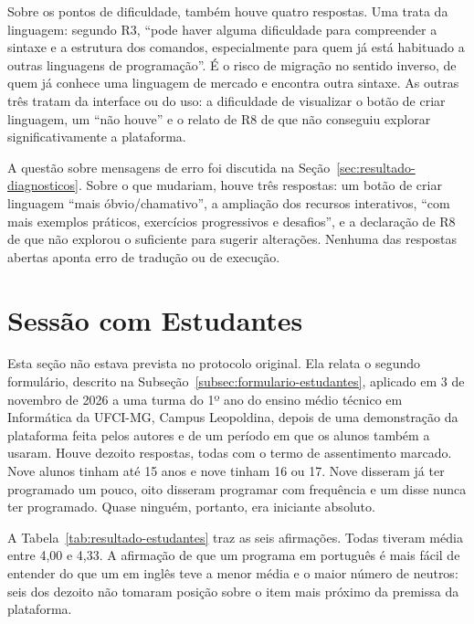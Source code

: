 Sobre os pontos de dificuldade, também houve quatro respostas. Uma trata da linguagem: segundo R3, ``pode haver alguma dificuldade para compreender a sintaxe e a estrutura dos comandos, especialmente para quem já está habituado a outras linguagens de programação''. É o risco de migração no sentido inverso, de quem já conhece uma linguagem de mercado e encontra outra sintaxe. As outras três tratam da interface ou do uso: a dificuldade de visualizar o botão de criar linguagem, um ``não houve'' e o relato de R8 de que não conseguiu explorar significativamente a plataforma.

A questão sobre mensagens de erro foi discutida na Seção~\ref{sec:resultado-diagnosticos}. Sobre o que mudariam, houve três respostas: um botão de criar linguagem ``mais óbvio/chamativo'', a ampliação dos recursos interativos, ``com mais exemplos práticos, exercícios progressivos e desafios'', e a declaração de R8 de que não explorou o suficiente para sugerir alterações. Nenhuma das respostas abertas aponta erro de tradução ou de execução.

\section{Sessão com Estudantes}
\label{sec:resultado-estudantes}

Esta seção não estava prevista no protocolo original. Ela relata o segundo formulário, descrito na Subseção~\ref{subsec:formulario-estudantes}, aplicado em 3 de novembro de 2026 a uma turma do 1º ano do ensino médio técnico em Informática da UFCI-MG, Campus Leopoldina, depois de uma demonstração da plataforma feita pelos autores e de um período em que os alunos também a usaram. Houve dezoito respostas, todas com o termo de assentimento marcado. Nove alunos tinham até 15 anos e nove tinham 16 ou 17. Nove disseram já ter programado um pouco, oito disseram programar com frequência e um disse nunca ter programado. Quase ninguém, portanto, era iniciante absoluto.

A Tabela~\ref{tab:resultado-estudantes} traz as seis afirmações. Todas tiveram média entre 4,00 e 4,33. A afirmação de que um programa em português é mais fácil de entender do que um em inglês teve a menor média e o maior número de neutros: seis dos dezoito não tomaram posição sobre o item mais próximo da premissa da plataforma.

